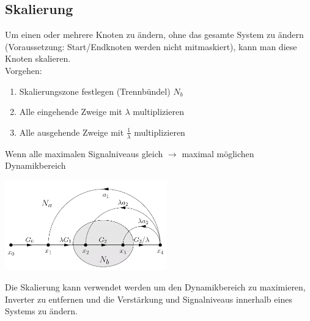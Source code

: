 \subsection{Skalierung }
	Um einen oder mehrere Knoten zu ändern, ohne das gesamte System zu
	ändern (Voraussetzung: Start/Endknoten werden nicht mitmaskiert), kann man
	diese Knoten skalieren.\\
	Vorgehen: 
	\begin{enumerate}
                \item Skalierungszone festlegen (Trennbündel) $N_b$
                \item Alle eingehende Zweige mit $\lambda$ multiplizieren
                \item Alle ausgehende Zweige mit $\frac{1}{\lambda}$
                multiplizieren
    \end{enumerate}
    Wenn alle maximalen Signalniveaus gleich $\rightarrow$ maximal möglichen
    Dynamikbereich\\
    \begin{minipage}{9cm}
      \includegraphics[width=7cm]{./bilder/sfd-scalierung.png}
    \end{minipage}
    \begin{minipage}{9cm}
      Die Skalierung kann verwendet werden um den Dynamikbereich zu maximieren, Inverter zu entfernen
      und die Verstärkung und Signalniveaus innerhalb eines Systems zu ändern.
    \end{minipage}
    

    

